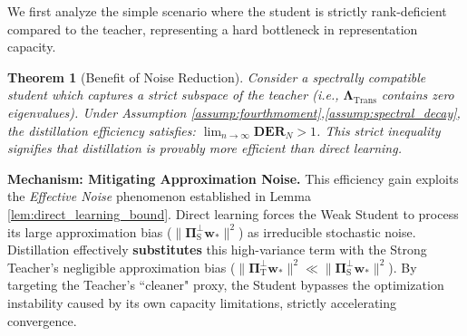 \documentclass{article}
\theoremstyle{definition}
\theoremstyle{definition}
\theoremstyle{plain}
\newtheorem{theorem}{Theorem}
\theoremstyle{plain}
\theoremstyle{plain}
\theoremstyle{plain}
\theoremstyle{plain}
\newcommand{\te}{\mathrm{T}}
\newcommand{\st}{\mathrm{S}}
\newcommand{\eff}{\mathrm{eff}}
\begin{document}
We first analyze the simple scenario where the student is strictly rank-deficient compared to the teacher, representing a hard bottleneck in representation capacity.

\begin{theorem}[Benefit of Noise Reduction]
\label{thm:rank_deficient_der}
    Consider a spectrally compatible student which captures a strict subspace of the teacher (i.e., $\mathbf{\Lambda}_{\mathrm{Trans}}$ contains zero eigenvalues). Under Assumption \ref{assump:fourthmoment},\ref{assump:spectral_decay}, the distillation efficiency satisfies: $\lim_{n\to\infty}\mathbf{DER}_N > 1$.
    This strict inequality signifies that distillation is provably more efficient than direct learning.
\end{theorem}


\textbf{Mechanism: Mitigating Approximation Noise.}
This efficiency gain exploits the \textit{Effective Noise} phenomenon established in Lemma \ref{lem:direct_learning_bound}.
Direct learning forces the Weak Student to process its large approximation bias ($\|\mathbf{\Pi}_\st^\perp \mathbf{w}_*\|^2$) as irreducible stochastic noise.
Distillation effectively \textbf{substitutes} this high-variance term with the Strong Teacher's negligible approximation bias ($\|\mathbf{\Pi}_\te^\perp \mathbf{w}_*\|^2 \ll \|\mathbf{\Pi}_\st^\perp \mathbf{w}_*\|^2$).
By targeting the Teacher's ``cleaner" proxy, the Student bypasses the optimization instability caused by its own capacity limitations, strictly accelerating convergence.
\end{document}
